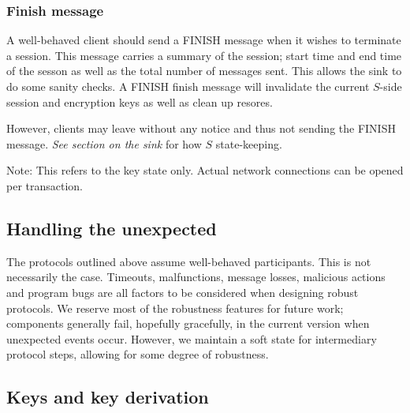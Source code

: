 \subsubsection{Finish message}

A well-behaved client should send a FINISH message when it wishes to
terminate a session. This message carries a summary of the session;
start time and end time of the sesson as well as the total number of
messages sent. This allows the sink to do some sanity checks. A FINISH
finish message will invalidate the current $S$-side session and
encryption keys as well as clean up resores.

However, clients may leave without any notice and thus not sending the FINISH message. \textit{See section on the sink} for how $S$ state-keeping. 

Note: This refers to the key state only. Actual network connections
can be opened per transaction.

\subsection{Handling the unexpected}

The protocols outlined above assume well-behaved participants. This is
not necessarily the case. Timeouts, malfunctions, message losses,
malicious actions and program bugs are all factors to be considered
when designing robust protocols. We reserve most of the robustness
features for future work; components generally fail, hopefully
gracefully, in the current version when unexpected events
occur. However, we maintain a soft state for intermediary protocol
steps, allowing for some degree of robustness.

\subsection{Keys and key derivation}

%
%

